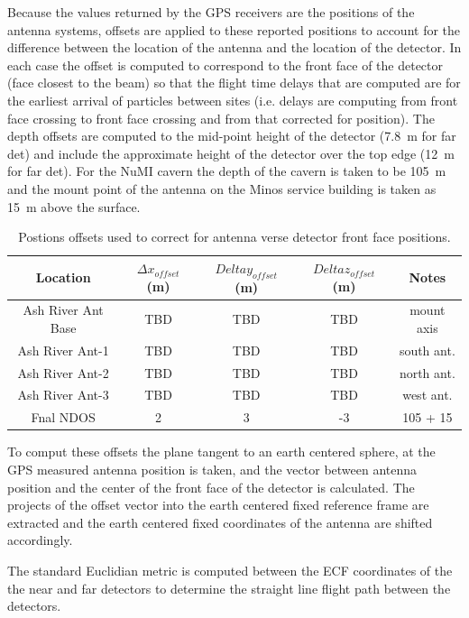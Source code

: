 Because the values returned by the GPS receivers are the positions of
the antenna systems, offsets are applied to these reported positions
to account for the difference between the location of the antenna and
the location of the detector.  In each case the offset is computed to
correspond to the front face of the detector (face closest to the
beam) so that the flight time delays that are computed are for the
earliest arrival of particles between sites (i.e. delays are computing
from front face crossing to front face crossing and from that
corrected for position).  The depth offsets are computed to the
mid-point height of the detector (7.8~m for far det) and include the
approximate height of the detector over the top edge (12~m for far
det).  For the NuMI cavern the depth of the cavern is taken to be
105~m and the mount point of the antenna on the Minos service building
is taken as 15~m above the surface.

\begin{table}
\begin{center}
\begin{tabular}{| c | c | c | c| c| }
\hline
Location & $\Delta x_{offset}$ (m) & $Delta y_{offset}$ (m) & $Delta
z_{offset}$ (m)& Notes\\
\hline
Ash River Ant Base & TBD & TBD & TBD  & mount axis \\
Ash River Ant-1     & TBD & TBD & TBD  & south ant.\\  
Ash River Ant-2     & TBD & TBD & TBD  & north ant.\\  
Ash River Ant-3     & TBD & TBD & TBD  & west ant.\\  
\hline
Fnal NDOS         &  2 & 3   & -3 &  105 + 15 \\
\hline
\end{tabular}
\caption[Antenna to Detector
Offsets]{\label{table:antenna_det_offsets} Postions offsets used to
  correct for antenna verse detector front face positions.}
\end{center}
\end{table}

To comput these offsets the plane tangent to an earth centered sphere,
at the GPS measured antenna position is taken, and the vector between
antenna position and the center of the front face of the detector is
calculated.  The projects of the offset vector into the earth centered
fixed reference frame are extracted and the earth centered fixed
coordinates of the antenna are shifted accordingly.

The standard Euclidian metric is computed between the ECF coordinates
of the the near and far detectors to determine the straight line
flight path between the detectors.

